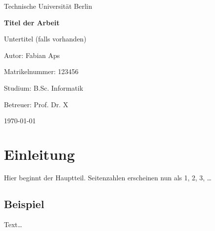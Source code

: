\documentclass[12pt,a4paper]{report} %
\begin{document}
\begin{titlepage}
  \centering
  {\Large Technische Universität Berlin\par}
  \vspace{2cm}
  {\Huge\bfseries Titel der Arbeit\par}
  \vspace{1.5cm}
  {\Large Untertitel (falls vorhanden)\par}
  \vfill
  {\large Autor: Fabian Aps\par}
  {\large Matrikelnummer: 123456\par}
  {\large Studium: B.Sc. Informatik\par}
  \vspace{1cm}
  {\large Betreuer: Prof. Dr. X\par}
  \vspace{2cm}
  {\large \today\par}
  \thispagestyle{empty} %
\end{titlepage}

\cleardoublepage
{} %
\setcounter{page}{1}  %

\tableofcontents
\clearpage

\cleardoublepage
{}
\setcounter{page}{1}

\chapter{Einleitung}\label{ch:einleitung}
Hier beginnt der Hauptteil.
Seitenzahlen erscheinen nun als 1, 2, 3, \ldots

\section{Beispiel}\label{sec:beispiel}
Text\ldots
\end{document}
